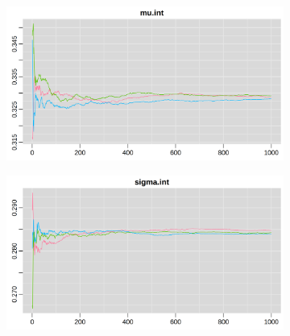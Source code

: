 \documentclass[12pt]{article}
\begin{document}
\begin{figure}[h!]
    \centering
    \begin{subfigure}{0.45\textwidth}
        \includegraphics[width=\linewidth]{pictures/mod2/mod2rmean_muint.png}
    \end{subfigure}
    \begin{subfigure}{0.45\textwidth}
        \includegraphics[width=\linewidth]{pictures/mod2/mod2rmean_sigmaint.png}
    \end{subfigure}


\end{figure}
\end{document}
